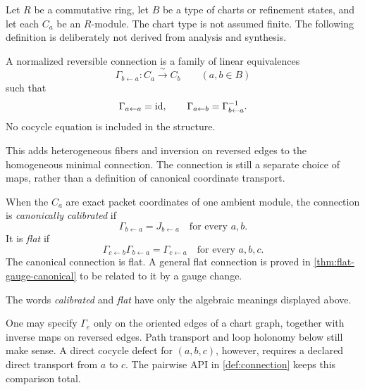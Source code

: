 Let $R$ be a commutative ring, let $B$ be a type of charts or refinement
states, and let each $C_a$ be an $R$-module.  The chart type is not assumed
finite.  The following definition is deliberately not derived from analysis
and synthesis.

\begin{definition}
\label{def:connection}
A normalized reversible connection is a family of linear equivalences
\[
\Gamma_{b\leftarrow a}:C_a\xrightarrow{\;\sim\;}C_b
\qquad(a,b\in B)
\]
such that
\[
\Gamma_{a\leftarrow a}=\operatorname{id},
\qquad
\Gamma_{a\leftarrow b}=\Gamma_{b\leftarrow a}^{-1}.
\]
No cocycle equation is included in the structure.
\end{definition}

This adds heterogeneous fibers and inversion on reversed edges to the
homogeneous minimal connection.  The connection is still a separate choice
of maps, rather than a definition of canonical coordinate transport.

\begin{definition}
\label{def:calibration-flatness}
When the $C_a$ are exact packet coordinates of one ambient module, the
connection is \emph{canonically calibrated} if
\[
\Gamma_{b\leftarrow a}=J_{b\leftarrow a}
\quad\text{for every }a,b.
\]
It is \emph{flat} if
\[
\Gamma_{c\leftarrow b}\Gamma_{b\leftarrow a}
=
\Gamma_{c\leftarrow a}
\quad\text{for every }a,b,c.
\]
The canonical connection is flat.  A general flat connection is proved in
\cref{thm:flat-gauge-canonical} to be related to it by a gauge change.
\end{definition}

The words \emph{calibrated} and \emph{flat} have only the algebraic meanings
displayed above.

\begin{remark}
One may specify $\Gamma_e$ only on the oriented edges of a chart graph,
together with inverse maps on reversed edges.  Path transport and loop
holonomy below still make sense.  A direct cocycle defect for $(a,b,c)$,
however, requires a declared direct transport from $a$ to $c$.  The pairwise
API in \cref{def:connection} keeps this comparison total.
\end{remark}

